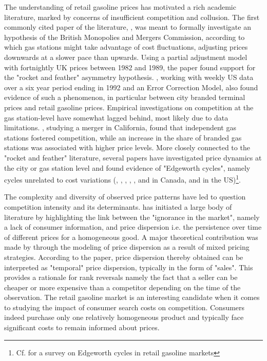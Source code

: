 \documentclass[english]{article}
\begin{document}
The understanding of retail gasoline prices has motivated a rich academic literature, marked by concerns of insufficient competition and collusion. The first commonly cited paper of the literature, \cite{BAC91}, was meant to formally investigate an hypothesis of the British Monopolies and Mergers Commission, according to which gas stations might take advantage of cost fluctuations, adjusting prices downwards at a slower pace than upwards. Using a partial adjustment model with fortnightly UK prices between 1982 and 1989, the paper found support for the "rocket and feather" asymmetry hypothesis. \cite{BOR97}, working with weekly US data over a six year period ending in 1992 and an Error Correction Model, also found evidence of such a phenomenon, in particular between city branded terminal prices and retail gasoline prices. Empirical investigations on competition at the gas station-level have somewhat lagged behind, most likely due to data limitations. \cite{HAS04}, studying a merger in California, found that independent gas stations fostered competition, while an increase in the share of branded gas stations was associated with higher price levels. More closely connected to the "rocket and feather" literature, several papers have investigated price dynamics at the city or gas station level and found evidence of "Edgeworth cycles", namely cycles unrelated to cost variations (\cite{ECK02}, \cite{ECK03}, \cite{ECK04a}, \cite{ECK04b}, \cite{NOE07a}, \cite{NOE07b} and \cite{NOE08} in Canada, \cite{LEW09} and \cite{LEW11a} in the US)\footnote{Cf. \cite{ECK13} for a survey on Edgeworth cycles in retail gasoline markets}.

The complexity and diversity of observed price patterns have led to question competition intensity and its determinants. \cite{STI61} has initiated a large body of literature by highlighting the link between the "ignorance in the market", namely a lack of consumer information, and price dispersion i.e. the persistence over time of different prices for a homogeneous good. A major theoretical contribution was made by \cite{VAR80} through the modeling of price dispersion as a result of mixed pricing strategies. According to the paper, price dispersion thereby obtained can be interpreted as "temporal" price dispersion, typically in the form of "sales". This provides a rationale for rank reversals namely the fact that a seller can be cheaper or more expensive than a competitor depending on the time of the observation. The retail gasoline market is an interesting candidate when it comes to studying the impact of consumer search costs on competition. Consumers indeed purchase only one relatively homogeneous product and typically face significant costs to remain informed about prices.
\end{document}
